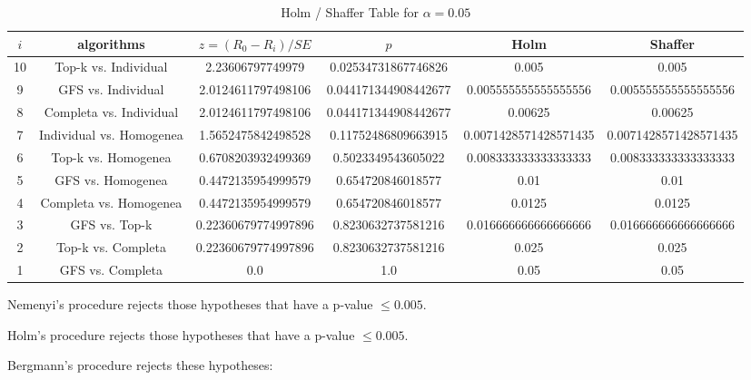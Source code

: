 \documentclass[a4paper,10pt]{article}
\begin{document}
\begin{landscape}
\begin{table}[!htp]
\centering\tiny
\caption{Holm / Shaffer Table for $\alpha=0.05$}
\begin{tabular}{cccccc}
$i$&algorithms&$z=(R_0 - R_i)/SE$&$p$&Holm&Shaffer\\
\hline
10&Top-k vs. Individual&2.23606797749979&0.02534731867746826&0.005&0.005\\
9&GFS vs. Individual&2.0124611797498106&0.044171344908442677&0.005555555555555556&0.005555555555555556\\
8&Completa vs. Individual&2.0124611797498106&0.044171344908442677&0.00625&0.00625\\
7&Individual vs. Homogenea&1.5652475842498528&0.11752486809663915&0.0071428571428571435&0.0071428571428571435\\
6&Top-k vs. Homogenea&0.6708203932499369&0.5023349543605022&0.008333333333333333&0.008333333333333333\\
5&GFS vs. Homogenea&0.4472135954999579&0.654720846018577&0.01&0.01\\
4&Completa vs. Homogenea&0.4472135954999579&0.654720846018577&0.0125&0.0125\\
3&GFS vs. Top-k&0.22360679774997896&0.8230632737581216&0.016666666666666666&0.016666666666666666\\
2&Top-k vs. Completa&0.22360679774997896&0.8230632737581216&0.025&0.025\\
1&GFS vs. Completa&0.0&1.0&0.05&0.05\\
\hline
\end{tabular}
\end{table}
Nemenyi's procedure rejects those hypotheses that have a p-value $\le0.005$.


Holm's procedure rejects those hypotheses that have a p-value $\le0.005$.


Bergmann's procedure rejects these hypotheses:


\begin{itemize}


\end{itemize}



\end{landscape}
\end{document}

